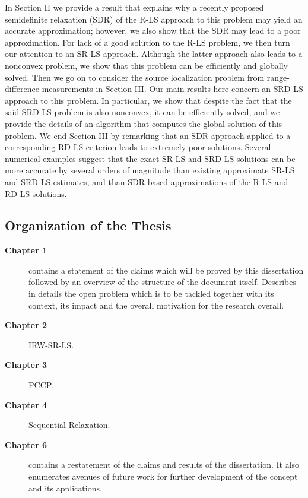 In Section II we provide a result that explains why a recently proposed semidefinite relaxation (SDR) \cite{Cheung} of the R-LS approach to this problem may yield an accurate approximation; however, we also show that the SDR may lead to a poor approximation. For lack of a good solution to the R-LS problem, we then turn our attention to an SR-LS approach. Although the latter approach also leads to a nonconvex problem, we show that this problem can be efficiently and globally solved. Then we go on to consider the source localization problem from range-difference measurements in Section III. Our main results here concern an SRD-LS approach to this problem. In particular, we show that despite the fact that the said SRD-LS problem is also nonconvex, it can be efficiently solved, and we provide the details of an algorithm that computes the global solution of this problem. We end Section III by remarking that an SDR approach applied to a corresponding RD-LS criterion leads to extremely poor solutions. Several numerical examples suggest that the exact SR-LS and SRD-LS solutions can be more accurate by several orders of magnitude than existing approximate SR-LS and SRD-LS estimates, and than SDR-based approximations of the R-LS and
RD-LS solutions.

\subsection{Organization of the Thesis} \label{organization}

\begin{description}
\item[\textbf{Chapter 1}] contains a statement of
the claims which will be proved by this dissertation followed by an overview of the structure of the document itself. Describes in details the open problem which is to be tackled together with its context, its impact and the overall motivation for the research overall.
\item[\textbf{Chapter 2}] IRW-SR-LS.
\item[\textbf{Chapter 3}] PCCP.
\item[\textbf{Chapter 4}] Sequential Relaxation.
\item[\textbf{Chapter 6}] contains a restatement of the claims and results of the dissertation. It also enumerates avenues of future work for further development of the concept and its applications.
\end{description}